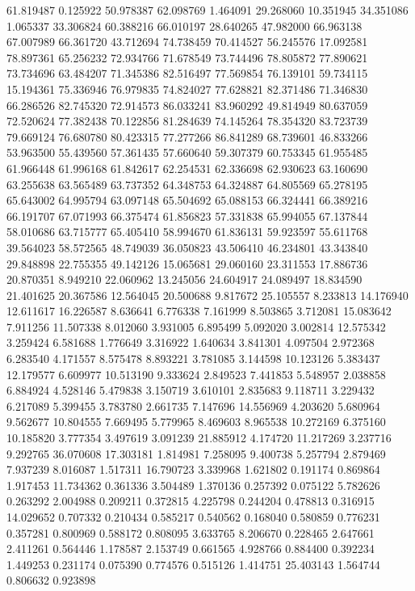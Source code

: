 61.819487
0.125922
50.978387
62.098769
1.464091
29.268060
10.351945
34.351086
1.065337
33.306824
60.388216
66.010197
28.640265
47.982000
66.963138
67.007989
66.361720
43.712694
74.738459
70.414527
56.245576
17.092581
78.897361
65.256232
72.934766
71.678549
73.744496
78.805872
77.890621
73.734696
63.484207
71.345386
82.516497
77.569854
76.139101
59.734115
15.194361
75.336946
76.979835
74.824027
77.628821
82.371486
71.346830
66.286526
82.745320
72.914573
86.033241
83.960292
49.814949
80.637059
72.520624
77.382438
70.122856
81.284639
74.145264
78.354320
83.723739
79.669124
76.680780
80.423315
77.277266
86.841289
68.739601
46.833266
53.963500
55.439560
57.361435
57.660640
59.307379
60.753345
61.955485
61.966448
61.996168
61.842617
62.254531
62.336698
62.930623
63.160690
63.255638
63.565489
63.737352
64.348753
64.324887
64.805569
65.278195
65.643002
64.995794
63.097148
65.504692
65.088153
66.324441
66.389216
66.191707
67.071993
66.375474
61.856823
57.331838
65.994055
67.137844
58.010686
63.715777
65.405410
58.994670
61.836131
59.923597
55.611768
39.564023
58.572565
48.749039
36.050823
43.506410
46.234801
43.343840
29.848898
22.755355
49.142126
15.065681
29.060160
23.311553
17.886736
20.870351
8.949210
22.060962
13.245056
24.604917
24.089497
18.834590
21.401625
20.367586
12.564045
20.500688
9.817672
25.105557
8.233813
14.176940
12.611617
16.226587
8.636641
6.776338
7.161999
8.503865
3.712081
15.083642
7.911256
11.507338
8.012060
3.931005
6.895499
5.092020
3.002814
12.575342
3.259424
6.581688
1.776649
3.316922
1.640634
3.841301
4.097504
2.972368
6.283540
4.171557
8.575478
8.893221
3.781085
3.144598
10.123126
5.383437
12.179577
6.609977
10.513190
9.333624
2.849523
7.441853
5.548957
2.038858
6.884924
4.528146
5.479838
3.150719
3.610101
2.835683
9.118711
3.229432
6.217089
5.399455
3.783780
2.661735
7.147696
14.556969
4.203620
5.680964
9.562677
10.804555
7.669495
5.779965
8.469603
8.965538
10.272169
6.375160
10.185820
3.777354
3.497619
3.091239
21.885912
4.174720
11.217269
3.237716
9.292765
36.070608
17.303181
1.814981
7.258095
9.400738
5.257794
2.879469
7.937239
8.016087
1.517311
16.790723
3.339968
1.621802
0.191174
0.869864
1.917453
11.734362
0.361336
3.504489
1.370136
0.257392
0.075122
5.782626
0.263292
2.004988
0.209211
0.372815
4.225798
0.244204
0.478813
0.316915
14.029652
0.707332
0.210434
0.585217
0.540562
0.168040
0.580859
0.776231
0.357281
0.800969
0.588172
0.808095
3.633765
8.206670
0.228465
2.647661
2.411261
0.564446
1.178587
2.153749
0.661565
4.928766
0.884400
0.392234
1.449253
0.231174
0.075390
0.774576
0.515126
1.414751
25.403143
1.564744
0.806632
0.923898
